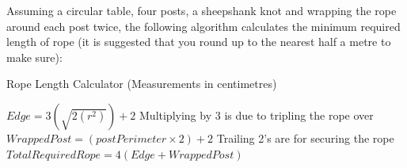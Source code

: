 Assuming a circular table, four posts, a sheepshank knot and wrapping the rope
around each post twice, the following algorithm calculates the minimum required
length of rope (it is suggested that you round up to the nearest half a metre 
to make sure):

\begin{algorithm}
  \caption{Rope Length Calculator (Measurements in centimetres) }
  \label{desSysRope}
  \begin{algorithmic}[1]
    \State $ Edge = 3(\sqrt{2(r^{2} ) } ) + 2 $
    \Comment Multiplying by 3 is due to tripling the rope over
    \State $ WrappedPost = (postPerimeter \times 2) + 2 $
    \Comment Trailing 2's are for securing the rope
    \State $ TotalRequiredRope = 4(Edge + WrappedPost) $
  \end{algorithmic}
\end{algorithm}